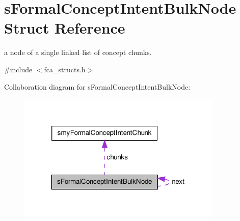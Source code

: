 \hypertarget{structsFormalConceptIntentBulkNode}{\section{s\-Formal\-Concept\-Intent\-Bulk\-Node \-Struct \-Reference}
\label{structsFormalConceptIntentBulkNode}
}


a node of a single linked list of concept chunks.  




{\ttfamily \#include $<$fca\-\_\-structs.\-h$>$}



\-Collaboration diagram for s\-Formal\-Concept\-Intent\-Bulk\-Node\-:\nopagebreak
\begin{figure}[H]
\begin{center}
\leavevmode
\includegraphics[width=276pt]{structsFormalConceptIntentBulkNode__coll__graph}
\end{center}
\end{figure}
